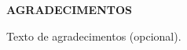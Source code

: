 \begin{center}
	\normalsize
	\textbf{AGRADECIMENTOS}
\end{center}

  Texto de agradecimentos (opcional).